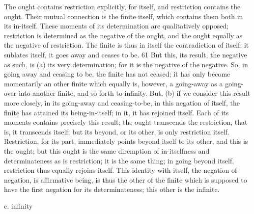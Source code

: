 The ought contains restriction explicitly, for itself, and restriction contains
the ought. Their mutual connection is the finite itself, which contains them
both in its in-itself. These moments of its determination are qualitatively
opposed; restriction is determined as the negative of the ought, and the
ought equally as the negative of restriction. The finite is thus in itself the
contradiction of itself; it sublates itself, it goes away and ceases to be. 61
But this, its result, the negative as such, is (a) its very determination; for
it is the negative of the negative. So, in going away and ceasing to be,
the finite has not ceased; it has only become momentarily an other finite
which equally is, however, a going-away as a going-over into another finite,
and so forth to infinity. But, (b) if we consider this result more closely, in
its going-away and ceasing-to-be, in this negation of itself, the finite has
attained its being-in-itself; in it, it has rejoined itself. Each of its moments
contains precisely this result; the ought transcends the restriction, that is,
it transcends itself; but its beyond, or its other, is only restriction itself.
Restriction, for its part, immediately points beyond itself to its other, and
this is the ought; but this ought is the same diremption of in-itselfness and
determinateness as is restriction; it is the same thing; in going beyond itself,
restriction thus equally rejoins itself. This identity with itself, the negation
of negation, is affirmative being, is thus the other of the finite which is
supposed to have the first negation for its determinateness; this other is the
infinite.

c. infinity

